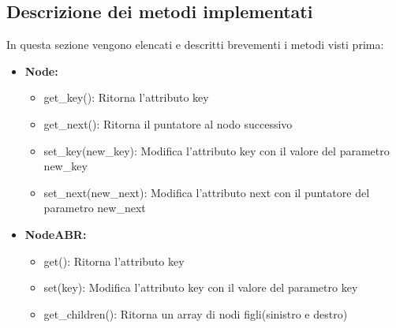 \documentclass{article}
\begin{document}
\subsection{Descrizione dei metodi implementati}
In questa sezione vengono elencati e descritti brevementi i metodi visti prima:
\begin{itemize}
    \item \textbf{Node:} 
    \begin{itemize}
        \item get\_key(): Ritorna l'attributo key
        \item get\_next(): Ritorna il puntatore al nodo successivo
        \item set\_key(new\_key): Modifica l’attributo key con il valore del parametro new\_key
        \item set\_next(new\_next): Modifica l’attributo next con il puntatore del parametro new\_next 
    \end{itemize}
    
    \item \textbf {NodeABR: } 
    \begin{itemize}
        \item get(): Ritorna l'attributo key
        \item set(key): Modifica l’attributo key con il valore del parametro key
        \item get\_children(): Ritorna un array di nodi figli(sinistro e destro)
    \end{itemize}
    

\end{itemize}
\end{document}
